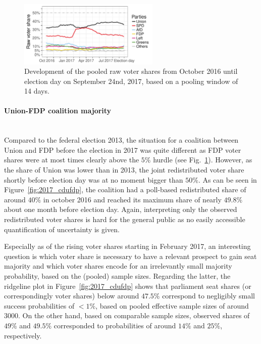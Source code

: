\documentclass[smallcondensed]{svjour3}     %
\begin{document}
\begin{figure}[H]\centering
\includegraphics[width=0.6\textwidth]{figures/2017_pooled_rawShares.pdf}
\caption{Development of the pooled raw voter shares from October 2016 until election day on September 24nd, 2017, based on a pooling window of 14 days.
\label{fig:2017}
}
\end{figure}


\paragraph{Union-FDP coalition majority} \ \\
Compared to the federal election 2013, the situation for a
coalition between Union and FDP before the election in 2017
was quite different as FDP voter shares were at most times
clearly above the $5\%$ hurdle (see Fig.~\ref{fig:2017}).
However, as the share of Union was lower than in 2013,
the joint redistributed voter share shortly before election day
was at no moment bigger than $50\%$.
As can be seen in Figure~\ref{fig:2017_cdufdp}, the coalition had
a poll-based redistributed share of around $40\%$ in october 2016
and reached its maximum share of nearly $49.8\%$ about one month
before election day.
Again, interpreting only the observed redistributed voter shares
is hard for the general public as no easily accessible quantification
of uncertainty is given.

Especially as of the rising voter shares starting in February 2017,
an interesting question is which voter share is necessary to have
a relevant prospect to gain seat majority and which voter shares
encode for an irrelevantly small majority probability, based on the
(pooled) sample sizes.
Regarding the latter, the ridgeline plot in Figure~\ref{fig:2017_cdufdp}
shows that parliament seat shares (or correspondingly voter shares)
below around $47.5\%$ correspond to negligibly small success probabilities of $<1\%$,
based on pooled effective sample sizes of around 3000.
On the other hand, based on comparable sample sizes,
observed shares of $49\%$ and $49.5\%$
corresponded to probabilities of around $14\%$ and $25\%$, respectively.
\end{document}
